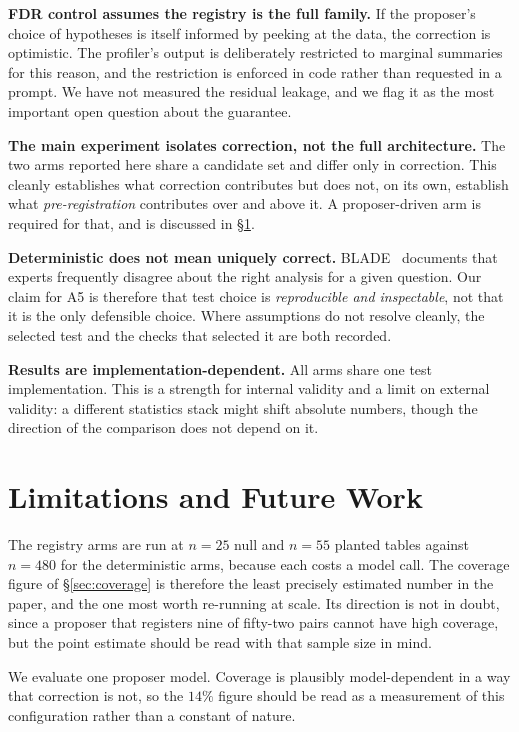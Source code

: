 \documentclass[10pt,twocolumn]{article}
\newcommand{\phead}[1]{\smallskip\noindent\textbf{#1.}\hspace{0.6em}\ignorespaces}
\begin{document}
\phead{FDR control assumes the registry is the full family} If the
proposer's choice of hypotheses is itself informed by peeking at the data, the
correction is optimistic. The profiler's output is deliberately restricted to
marginal summaries for this reason, and the restriction is enforced in code
rather than requested in a prompt. We have not measured the residual leakage,
and we flag it as the most important open question about the guarantee.

\phead{The main experiment isolates correction, not the full architecture}
The two arms reported here share a candidate set and differ only in correction.
This cleanly establishes what correction contributes but does not, on its own,
establish what \emph{pre-registration} contributes over and above it. A
proposer-driven arm is required for that, and is discussed in
\S\ref{sec:limits}.

\phead{Deterministic does not mean uniquely correct}
BLADE~\cite{gu2024blade} documents that experts frequently disagree about the
right analysis for a given question. Our claim for A5 is therefore that test
choice is \emph{reproducible and inspectable}, not that it is the only
defensible choice. Where assumptions do not resolve cleanly, the selected test
and the checks that selected it are both recorded.

\phead{Results are implementation-dependent} All arms share one test
implementation. This is a strength for internal validity and a limit on external
validity: a different statistics stack might shift absolute numbers, though the
direction of the comparison does not depend on it.

\section{Limitations and Future Work}
\label{sec:limits}

The registry arms are run at $n=25$ null and $n=55$ planted tables against
$n=480$ for the deterministic arms, because each costs a model call. The
coverage figure of \S\ref{sec:coverage} is therefore the least precisely
estimated number in the paper, and the one most worth re-running at scale. Its
direction is not in doubt, since a proposer that registers nine of fifty-two
pairs cannot have high coverage, but the point estimate should be read with that
sample size in mind.

We evaluate one proposer model. Coverage is plausibly model-dependent in a way
that correction is not, so the $14\%$ figure should be read as a measurement of
this configuration rather than a constant of nature.
\end{document}
